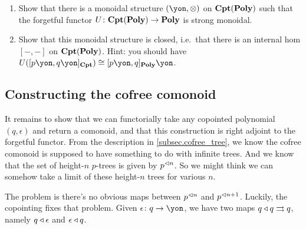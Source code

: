 \documentclass[Book-Poly]{subfiles}
\begin{document}
\begin{exercise}
\begin{enumerate}
	\item Show that there is a monoidal structure $(\yon,\otimes)$ on $\mathbf{Cpt}(\mathbf{Poly})$ such that the forgetful functor $U\colon\mathbf{Cpt}(\mathbf{Poly})\to\mathbf{Poly}$ is strong monoidal.
	\item Show that this monoidal structure is closed, i.e.\ that there is an internal hom $[-,-]$ on $\mathbf{Cpt}(\mathbf{Poly})$. Hint: you should have $U([p\yon,q\yon]_{\Cat{Cpt}})\cong[p\yon,q]_{\poly}\yon$.
\qedhere
\end{enumerate}
\end{exercise}

\subsection{Constructing the cofree comonoid}

It remains to show that we can functorially take any copointed polynomial $(q,\epsilon)$ and return a comonoid, and that this construction is right adjoint to the forgetful functor. From the description in \cref{subsec.cofree_tree}, we know the cofree comonoid is supposed to have something to do with infinite trees. And we know that the set of height-$n$ $p$-trees is given by $p^{\lhd n}$. So we might think we can somehow take a limit of these height-$n$ trees for various $n$. 

The problem is there's no obvious maps between $p^{\lhd n}$ and $p^{\lhd n+1}$. Luckily, the copointing fixes that problem. Given $\epsilon\colon q\to\yon$, we have two maps $q\mathbin{\triangleleft} q\rightrightarrows q$, namely $q\mathbin{\triangleleft}\epsilon$ and $\epsilon\mathbin{\triangleleft} q$.
\end{document}
